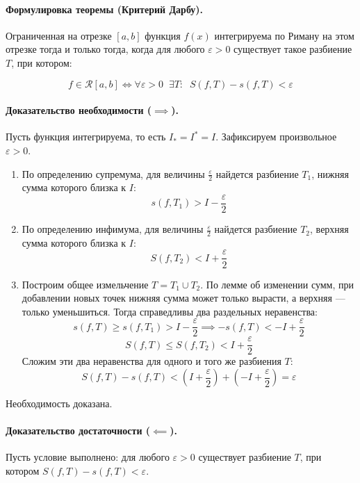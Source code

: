 \paragraph{Формулировка теоремы (Критерий Дарбу).}
Ограниченная на отрезке $[a, b]$ функция $f(x)$ интегрируема по Риману на этом отрезке тогда и только тогда, когда для любого $\varepsilon > 0$ существует такое разбиение $T$, при котором:
\begin{tcolorbox}[colback=white, colframe=black, boxrule=0.5pt, arc=0pt, borderline={0.5pt}{0pt}{black, dashed}]
$$ f \in \mathcal{R}[a,b] \iff \forall \varepsilon > 0 \;\; \exists T : \;\; S(f, T) - s(f, T) < \varepsilon $$
\end{tcolorbox}

\paragraph{Доказательство необходимости ($\implies$).}
Пусть функция интегрируема, то есть $I_* = I^* = I$. Зафиксируем произвольное $\varepsilon > 0$.
\begin{enumerate}
    \item По определению супремума, для величины $\frac{\varepsilon}{2}$ найдется разбиение $T_1$, нижняя сумма которого близка к $I$:
    $$ s(f, T_1) > I - \frac{\varepsilon}{2} $$
    \item По определению инфимума, для величины $\frac{\varepsilon}{2}$ найдется разбиение $T_2$, верхняя сумма которого близка к $I$:
    $$ S(f, T_2) < I + \frac{\varepsilon}{2} $$
    \item Построим общее измельчение $T = T_1 \cup T_2$. По лемме об изменении сумм, при добавлении новых точек нижняя сумма может только вырасти, а верхняя — только уменьшиться. Тогда справедливы два раздельных неравенства:
    $$ s(f, T) \ge s(f, T_1) > I - \frac{\varepsilon}{2} \implies -s(f, T) < -I + \frac{\varepsilon}{2} $$
    $$ S(f, T) \le S(f, T_2) < I + \frac{\varepsilon}{2} $$
    Сложим эти два неравенства для одного и того же разбиения $T$:
    $$ S(f, T) - s(f, T) < \left(I + \frac{\varepsilon}{2}\right) + \left(-I + \frac{\varepsilon}{2}\right) = \varepsilon $$
\end{enumerate}
Необходимость доказана.

\paragraph{Доказательство достаточности ($\impliedby$).}
Пусть условие выполнено: для любого $\varepsilon > 0$ существует разбиение $T$, при котором $S(f, T) - s(f, T) < \varepsilon$.

